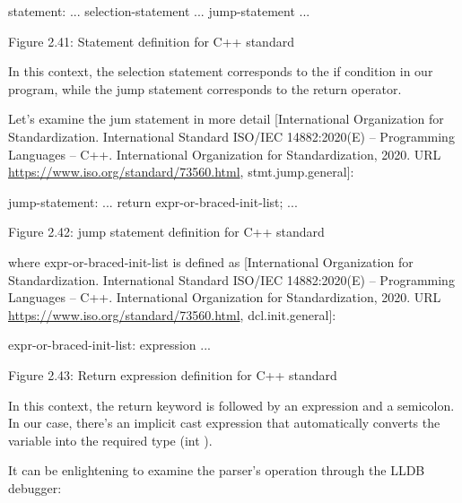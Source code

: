 \begin{shell}
statement:
    ...
    selection-statement
    ...
    jump-statement
    ...
\end{shell}

\begin{center}
Figure 2.41: Statement definition for C++ standard
\end{center}

In this context, the selection statement corresponds to the if condition in our program, while the jump statement corresponds to the return operator.

Let’s examine the jum statement in more detail [International Organization for Standardization. International Standard ISO/IEC 14882:2020(E) – Programming Languages – C++. International Organization for Standardization, 2020. URL \url{https://www.iso.org/standard/73560.html}, stmt.jump.general]:

\begin{shell}
jump-statement:
    ...
    return expr-or-braced-init-list;
    ...
\end{shell}

\begin{center}
Figure 2.42: jump statement definition for C++ standard
\end{center}

where expr-or-braced-init-list is defined as [International Organization for Standardization. International Standard ISO/IEC 14882:2020(E) – Programming Languages – C++. International Organization for Standardization, 2020. URL \url{https://www.iso.org/standard/73560.html}, dcl.init.general]:

\begin{shell}
expr-or-braced-init-list:
    expression
    ...
\end{shell}

\begin{center}
Figure 2.43: Return expression definition for C++ standard
\end{center}

In this context, the return keyword is followed by an expression and a semicolon. In our case, there’s an implicit cast expression that automatically converts the variable into the required type (int ).

It can be enlightening to examine the parser’s operation through the LLDB debugger:


